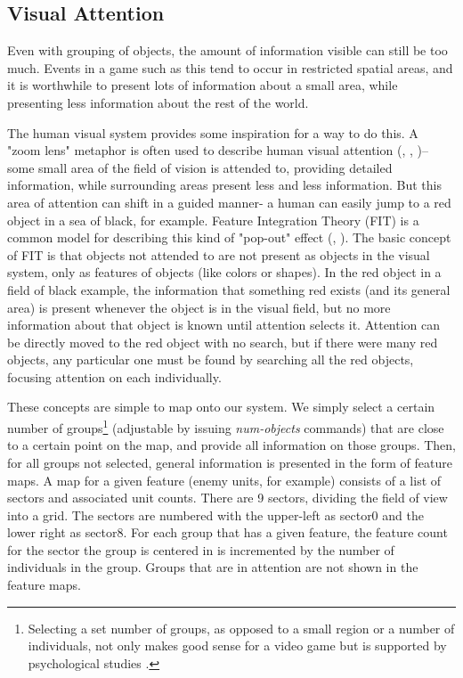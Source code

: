 \subsection{Visual Attention}

Even with grouping of objects, the amount of information visible can still be too much. Events in a game such as this tend to occur in restricted spatial areas, and it is worthwhile to present lots of information about a small area, while presenting less information about the rest of the world. 

The human visual system provides some inspiration for a way to do this. A "zoom lens" metaphor is often used to describe human visual attention (\cite{zoomlens}, \cite{hill99modeling}, \cite{anderson})-- some small area of the field of vision is attended to, providing detailed information, while surrounding areas present less and less information. But this area of attention can shift in a guided manner- a human can easily jump to a red object in a sea of black, for example. Feature Integration Theory (FIT) is a common model for describing this kind of "pop-out" effect (\cite{fit}, \cite{anderson}). The basic concept of FIT is that objects not attended to are not present as objects in the visual system, only as features of objects (like colors or shapes). In the red object in a field of black example, the information that something red exists (and its general area) is present whenever the object is in the visual field, but no more information about that object is known until attention selects it. Attention can be directly moved to the red object with no search, but if there were many red objects, any particular one must be found by searching all the red objects, focusing attention on each individually.

These concepts are simple to map onto our system. We simply select a certain number of groups\footnote{Selecting a set number of groups, as opposed to a small region or a number of individuals, not only makes good sense for a video game but is supported by psychological studies \cite{Scholl2001}.} (adjustable by issuing {\it num-objects} commands) that are close to a certain point on the map, and provide all information on those groups. Then, for all groups not selected, general information is presented in the form of feature maps. A map for a given feature (enemy units, for example) consists of a list of sectors and associated unit counts. There are 9 sectors, dividing the field of view into a grid. The sectors are numbered with the upper-left as sector0 and the lower right as sector8. For each group that has a given feature, the feature count for the sector the group is centered in is incremented by the number of individuals in the group. Groups that are in attention are not shown in the feature maps.

